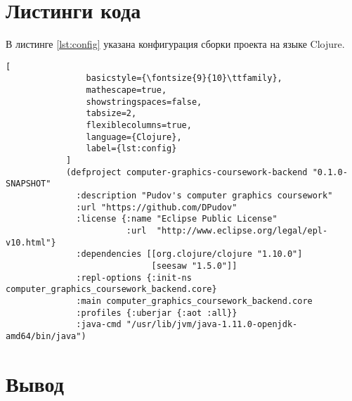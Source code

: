 \section{Листинги кода}

В листинге \ref{lst:config} указана конфигурация сборки проекта на языке Clojure.

\begin{lstlisting}[
                basicstyle={\fontsize{9}{10}\ttfamily},
                mathescape=true,
                showstringspaces=false,
                tabsize=2,
                flexiblecolumns=true,
                language={Clojure},
                label={lst:config}
            ]
            (defproject computer-graphics-coursework-backend "0.1.0-SNAPSHOT"
              :description "Pudov's computer graphics coursework"
              :url "https://github.com/DPudov"
              :license {:name "Eclipse Public License"
                        :url  "http://www.eclipse.org/legal/epl-v10.html"}
              :dependencies [[org.clojure/clojure "1.10.0"]
                             [seesaw "1.5.0"]]
              :repl-options {:init-ns computer_graphics_coursework_backend.core}
              :main computer_graphics_coursework_backend.core
              :profiles {:uberjar {:aot :all}}
              :java-cmd "/usr/lib/jvm/java-1.11.0-openjdk-amd64/bin/java")
\end{lstlisting}
\section{Вывод}

